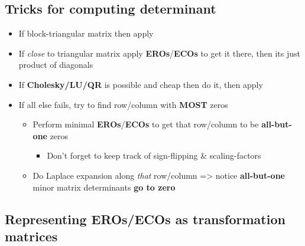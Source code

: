 \subsection*{Tricks for computing
      determinant}

\begin{itemize}

      \item
            If block-triangular matrix then apply
      \item
            If \emph{close} to triangular matrix apply \textbf{EROs}/\textbf{ECOs}
            to get it there, then its just product of diagonals
      \item
            If \textbf{Cholesky/LU/QR} is possible and cheap then do it, then
            apply 
      \item
            If all else fails, try to find row/column with \textbf{MOST} zeros

            \begin{itemize}

                  \item
                        Perform minimal \textbf{EROs}/\textbf{ECOs} to get that row/column
                        to be \textbf{all-but-one} zeros

                        \begin{itemize}

                              \item
                                    Don't forget to keep track of sign-flipping \& scaling-factors
                        \end{itemize}
                  \item
                        Do Laplace expansion along \emph{that} row/column =>
                        notice \textbf{all-but-one} minor matrix determinants \textbf{go to
                              zero}
            \end{itemize}
\end{itemize}

\subsection*{Representing EROs/ECOs as transformation matrices}


